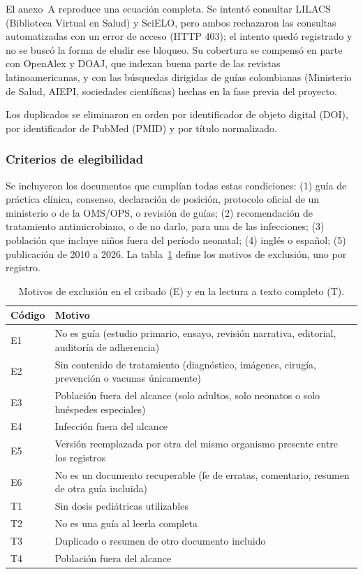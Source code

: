 \documentclass[11pt,a4paper]{article}
\begin{document}
El anexo~A reproduce una ecuación completa. Se intentó consultar LILACS (Biblioteca Virtual en Salud) y SciELO, pero ambos rechazaron las consultas automatizadas con un error de acceso (HTTP 403); el intento quedó registrado y no se buscó la forma de eludir ese bloqueo. Su cobertura se compensó en parte con OpenAlex y DOAJ, que indexan buena parte de las revistas latinoamericanas, y con las búsquedas dirigidas de guías colombianas (Ministerio de Salud, AIEPI, sociedades científicas) hechas en la fase previa del proyecto.

Los duplicados se eliminaron en orden por identificador de objeto digital (DOI), por identificador de PubMed (PMID) y por título normalizado.

\subsubsection{Criterios de elegibilidad}

Se incluyeron los documentos que cumplían todas estas condiciones: (1) guía de práctica clínica, consenso, declaración de posición, protocolo oficial de un ministerio o de la OMS/OPS, o revisión de guías; (2) recomendación de tratamiento antimicrobiano, o de no darlo, para una de las infecciones; (3) población que incluye niños fuera del período neonatal; (4) inglés o español; (5) publicación de 2010 a 2026. La tabla~\ref{tab:motivos} define los motivos de exclusión, uno por registro.

\begin{table}[htbp]
\centering
\caption{Motivos de exclusión en el cribado (E) y en la lectura a texto completo (T).}
\label{tab:motivos}
\small
\begin{tabularx}{\textwidth}{@{}lX@{}}
\toprule
Código & Motivo \\
\midrule
E1 & No es guía (estudio primario, ensayo, revisión narrativa, editorial, auditoría de adherencia) \\
E2 & Sin contenido de tratamiento (diagnóstico, imágenes, cirugía, prevención o vacunas únicamente) \\
E3 & Población fuera del alcance (solo adultos, solo neonatos o solo huéspedes especiales) \\
E4 & Infección fuera del alcance \\
E5 & Versión reemplazada por otra del mismo organismo presente entre los registros \\
E6 & No es un documento recuperable (fe de erratas, comentario, resumen de otra guía incluida) \\
\midrule
T1 & Sin dosis pediátricas utilizables \\
T2 & No es una guía al leerla completa \\
T3 & Duplicado o resumen de otro documento incluido \\
T4 & Población fuera del alcance \\
\bottomrule
\end{tabularx}
\end{table}
\end{document}
